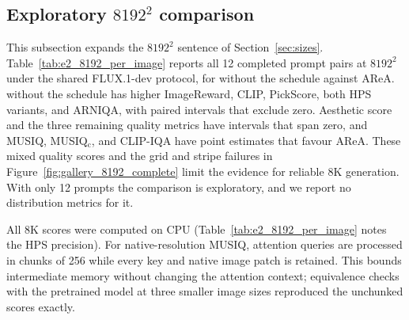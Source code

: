 \begin{table}[!htbp]
  \caption{\textbf{At $2048\times6144$ single-pass \sca{} wins seven of 15 metrics; at $2048\times4096$ the result is mixed.} Expands the aspect-ratio paragraph of Section~\ref{sec:sizes}. FLUX.1-dev, \nmain{} prompts each; AReA runs its released code. $\Delta$: single-pass \sca{} minus AReA, with its 95\% paired percentile-bootstrap interval in grey over 1000 prompt draws; for FID, KID, and their patch versions the draws also resample reference-image clusters.  / : significantly better / worse than AReA; for FID, KID, and time lower is better. $^\ddagger$Campaign mean on shared nodes. Key result: at $2048\times6144$ single-pass \sca{} wins seven of 15 metrics and loses two, at $2048\times4096$ it wins three and loses three, and it is faster at both.\pendAppWide}
  \label{tab:app_wide}
\end{table}

\subsection{Exploratory \texorpdfstring{$8192^2$}{8192x8192} comparison}
\label{app:8k}

This subsection expands the $8192^2$ sentence of Section~\ref{sec:sizes}. Table~\ref{tab:e2_8192_per_image} reports all 12 completed prompt pairs at $8192^2$ under the shared FLUX.1-dev protocol, for \sca{} without the schedule against AReA. \sca{} without the schedule has higher ImageReward, CLIP, PickScore, both HPS variants, and ARNIQA, with paired intervals that exclude zero. Aesthetic score and the three remaining quality metrics have intervals that span zero, and MUSIQ, MUSIQ$_\text{c}$, and CLIP-IQA have point estimates that favour AReA. These mixed quality scores and the grid and stripe failures in Figure~\ref{fig:gallery_8192_complete} limit the evidence for reliable 8K generation. With only 12 prompts the comparison is exploratory, and we report no distribution metrics for it.


All 8K scores were computed on CPU (Table~\ref{tab:e2_8192_per_image} notes the HPS precision). For native-resolution MUSIQ, attention queries are processed in chunks of 256 while every key and native image patch is retained. This bounds intermediate memory without changing the attention context; equivalence checks with the pretrained model at three smaller image sizes reproduced the unchunked scores exactly.


